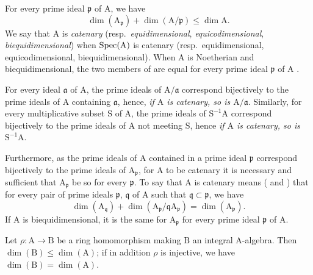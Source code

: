 \begin{env}[16.1.4]
\label{0.16.1.4}
For every prime ideal $\mathfrak{p}$ of $\mathrm{A}$, we have 
\begin{equation}
\label{0.16.1.4.1}
\tag{16.1.4.1}
  \dim(\mathrm{A}_\mathfrak{p})+\dim(\mathrm{A}/\mathfrak{p})\leq\dim\mathrm{A}.
\end{equation}
We say that $\mathrm{A}$ is \emph{catenary} (resp.~\emph{equidimensional}, \emph{equicodimensional}, \emph{biequidimensional}) when $\operatorname{Spec}(\mathrm{A})$ is catenary (resp.~equidimensional, equicodimensional, biequidimensional).
When $\mathrm{A}$ is Noetherian and biequidimensional, the two members of  are equal for every prime ideal $\mathfrak{p}$ of $\mathrm{A}$ .

For every ideal $\mathfrak{a}$ of $\mathrm{A}$, the prime ideals of $\mathrm{A}/\mathfrak{a}$ correspond bijectively to the prime ideals of $\mathrm{A}$ containing $\mathfrak{a}$, hence, \emph{if $\mathrm{A}$ is catenary, so is $\mathrm{A}/\mathfrak{a}$}.
Similarly, for every multiplicative subset $\mathrm{S}$ of $\mathrm{A}$, the prime ideals of $\mathrm{S}^{-1}\mathrm{A}$ correspond bijectively to the prime ideals of $\mathrm{A}$ not meeting $\mathrm{S}$, hence \emph{if $\mathrm{A}$ is catenary, so is $\mathrm{S}^{-1}\mathrm{A}$}.

Furthermore, as the prime ideals of $\mathrm{A}$ contained in a prime ideal $\mathfrak{p}$ correspond bijectively to the prime ideals of $\mathrm{A}_\mathfrak{p}$, for $\mathrm{A}$ to be catenary it is necessary and sufficient that $\mathrm{A}_\mathfrak{p}$ be so for every $\mathfrak{p}$.
To say that $\mathrm{A}$ is catenary means ( and ) that for every pair of prime ideals $\mathfrak{p}$, $\mathfrak{q}$ of $\mathrm{A}$ such that $\mathfrak{q}\subset\mathfrak{p}$, we have
\begin{equation}
\label{0.16.1.4.2}
\tag{16.1.4.2}
  \dim(\mathrm{A}_\mathfrak{q})+\dim(\mathrm{A}_\mathfrak{p}/\mathfrak{q}\mathrm{A}_\mathfrak{p})=\dim(\mathrm{A}_\mathfrak{p}).
\end{equation}
If $\mathrm{A}$ is biequidimensional, it is the same for $\mathrm{A}_\mathfrak{p}$ for every prime ideal $\mathfrak{p}$ of $\mathrm{A}$.
\end{env}

\begin{proposition}[16.1.5]
\label{0.16.1.5}
Let $\rho:\mathrm{A}\to\mathrm{B}$ be a ring homomorphism making $\mathrm{B}$ an integral $\mathrm{A}$-algebra.
Then $\dim(\mathrm{B})\leq\dim(\mathrm{A})$; if in addition $\rho$ is injective, we have $\dim(\mathrm{B})=\dim(\mathrm{A})$.
\end{proposition}

